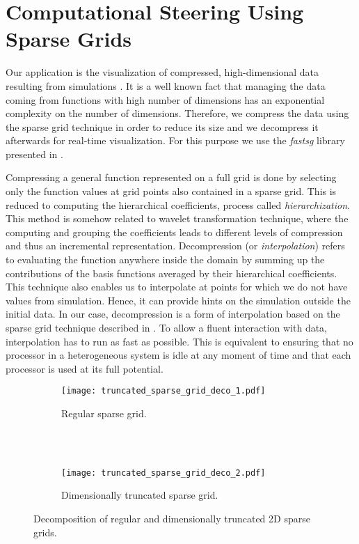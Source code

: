\section{Computational Steering Using Sparse Grids}
\label{sec:comp_steering}

Our application is the visualization of compressed, high-dimensional data
resulting from simulations \cite{Butnaru201156}. It is a well known fact that
managing the data coming from functions with high number of dimensions has an
exponential complexity on the number of dimensions. Therefore, we compress the
data using the sparse grid technique in order to reduce its size and we
decompress it afterwards for real-time visualization. For this purpose we use
the \textit{fastsg} library presented in \cite{murarasu12fastsg:}.

Compressing a general function represented on a full grid is done by selecting
only the function values at grid points also contained in a sparse grid. This is
reduced to computing the hierarchical coefficients, process called
\textit{hierarchization}. This method is somehow related to wavelet
transformation technique, where the computing and grouping the coefficients
leads to different levels of compression and thus an incremental representation.
Decompression (or \textit{interpolation}) refers to evaluating the function
anywhere inside the domain by summing up the contributions of the basis
functions averaged by their hierarchical coefficients. This technique also
enables us to interpolate at points for which we do not have values from
simulation. Hence, it can provide hints on the simulation outside the initial
data. In our case, decompression is a form of interpolation based on the sparse
grid technique described in \cite{CambridgeJournals:227245}. To allow a fluent
interaction with data, interpolation has to run as fast as possible. This is
equivalent to ensuring that no processor in a heterogeneous system is idle at
any moment of time and that each processor is used at its full potential.

\begin{figure}[t]
  \begin{subfigure}[b]{1\linewidth}
    \centering
    \texttt{[image: truncated\_sparse\_grid\_deco\_1.pdf]}
    \caption{Regular sparse grid.}
  \end{subfigure}
  \\ \\
  \begin{subfigure}[b]{1\linewidth}
    \centering
    \texttt{[image: truncated\_sparse\_grid\_deco\_2.pdf]}
    \caption{Dimensionally truncated sparse grid.}
  \end{subfigure}
  \caption{Decomposition of regular and dimensionally truncated 2D sparse
  grids.}
  \label{fig:truncated_sparse_grid_deco}
\end{figure}

